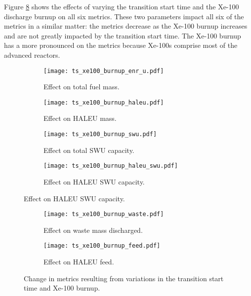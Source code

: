 Figure \ref{fig:ts_xe100_bu} shows the effects of varying the 
transition start time and the Xe-100 discharge burnup on all six 
metrics. These two parameters impact all six of the metrics in 
a similar matter: the metrics decrease as the Xe-100 burnup increases 
and are not greatly impacted by the transition start time. The 
Xe-100 burnup has a more pronounced on the metrics because Xe-100s 
comprise most of the advanced reactors. 

\begin{figure}
    \begin{subfigure}[t]{0.48\textwidth}
        \centering
        \texttt{[image: ts\_xe100\_burnup\_enr\_u.pdf]}
        \caption{Effect on total fuel mass.}
        \label{fig:ts_xe100_bu_enr_u}
    \end{subfigure}
    \hfill
    \begin{subfigure}[t]{0.48\textwidth}
        \centering
        \texttt{[image: ts\_xe100\_burnup\_haleu.pdf]}
        \caption{Effect on HALEU mass.}
        \label{fig:ts_xe100_bu_haleu}
    \end{subfigure}
    
    \begin{subfigure}[t]{0.48\textwidth}
        \centering
        \texttt{[image: ts\_xe100\_burnup\_swu.pdf]}
        \caption{Effect on total SWU capacity.}
        \label{fig:ts_xe100_bu_swu}
    \end{subfigure}
    \hfill
    \begin{subfigure}[t]{0.48\textwidth}
        \centering
        \texttt{[image: ts\_xe100\_burnup\_haleu\_swu.pdf]}
        \caption{Effect on HALEU SWU capacity.}
        \label{fig:ts_xe100_bu_haleu_swu}
    \end{subfigure}
\end{figure}

\begin{figure}
    \ContinuedFloat    
    \begin{subfigure}[t]{0.48\textwidth}
        \centering
        \texttt{[image: ts\_xe100\_burnup\_waste.pdf]}
        \caption{Effect on waste mass discharged.}
        \label{fig:ts_xe100_bu_waste}
    \end{subfigure}
    \hfill
    \begin{subfigure}[t]{0.48\textwidth}
        \centering
        \texttt{[image: ts\_xe100\_burnup\_feed.pdf]}
        \caption{Effect on HALEU feed.}
        \label{fig:ts_xe100_bu_feed}
    \end{subfigure}
    \caption{Change in metrics resulting from variations in the 
    transition start time and Xe-100 burnup.}
    \label{fig:ts_xe100_bu}
\end{figure}


